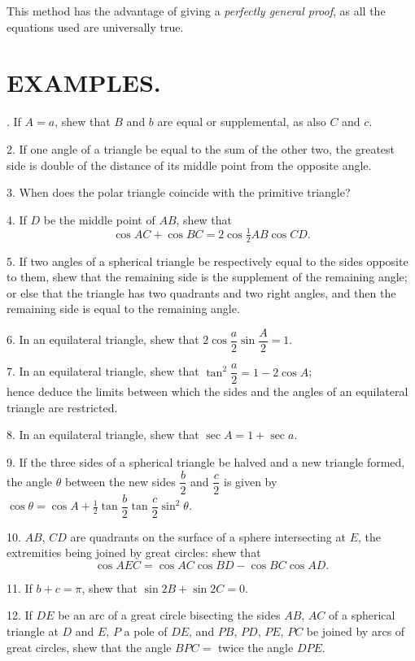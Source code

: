 \documentclass{book}[2004/02/16]
\begin{document}
\begin{mainmatter}
\begin{spacing}{1.3}
This method has the advantage of giving a \textit{perfectly general
proof}, as all the equations used are universally true.

\section*{\centering\normalsize EXAMPLES.}

. If $A = a$, shew that $B$ and $b$ are equal or supplemental, as
also $C$ and $c$.
\medskip

2. If one angle of a triangle be equal to the sum of the other
two, the greatest side is double of the distance of its middle point
from the opposite angle.
\medskip

3. When does the polar triangle coincide with the primitive
triangle?
\medskip

4. If $D$ be the middle point of $AB$, shew that
\[
\cos AC + \cos BC = 2 \cos \tfrac{1}{2} AB \cos CD.
\]

5. If two angles of a spherical triangle be respectively equal
to the sides opposite to them, shew that the remaining side is the
supplement of the remaining angle; or else that the triangle has
two quadrants and two right angles, and then the remaining side
is equal to the remaining angle.
\medskip

6. In an equilateral triangle, shew that $2 \cos \dfrac a2 \sin \dfrac A2 = 1$.
\medskip

7. In an equilateral triangle, shew that $\tan^2 \dfrac a2 = 1 - 2 \cos A$;\\
hence deduce the limits between which the sides and the angles of
an equilateral triangle are restricted.
\medskip

8. In an equilateral triangle, shew that $\sec A = 1 + \sec a$.
\medskip

9. If the three sides of a spherical triangle be halved and
a new triangle formed, the angle $\theta$ between the new sides $\dfrac b2$ and $\dfrac c2$
is given by $\cos \theta = \cos A + \tfrac 12 \tan \dfrac b2 \tan \dfrac c2 \sin^2 \theta$.
\medskip

10. $AB$, $CD$ are quadrants on the surface of a sphere intersecting
at $E$, the extremities being joined by great circles: shew
that
\[
\cos AEC = \cos AC \cos BD - \cos BC \cos AD.
\]

11. If $b + c = \pi$, shew that $\sin 2B + \sin 2C = 0$.
\medskip

12. If $DE$ be an arc of a great circle bisecting the sides $AB$,
$AC$ of a spherical triangle at $D$ and $E$, $P$ a pole of $DE$, and $PB$,
$PD$, $PE$, $PC$ be joined by arcs of great circles, shew that the angle
$BPC =$ twice the angle $DPE$.
\medskip


\end{spacing}
\end{mainmatter}
\end{document}
